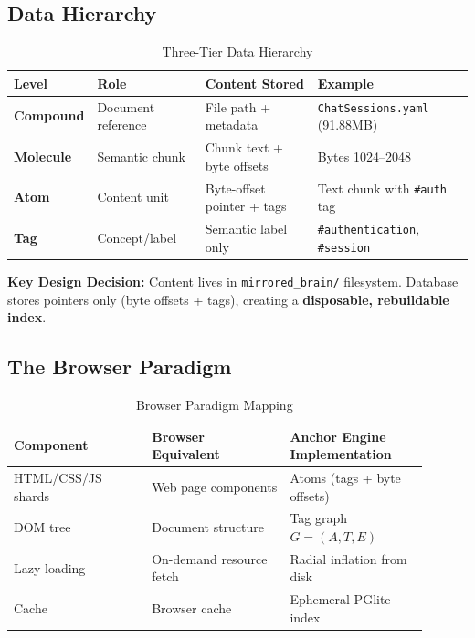 \documentclass[11pt]{article}
\begin{document}
\subsection{Data Hierarchy}

\begin{table}[h]
\centering
\caption{Three-Tier Data Hierarchy}
\label{tab:hierarchy}
\begin{tabular}{@{}llll@{}}
\toprule
\textbf{Level} & \textbf{Role} & \textbf{Content Stored} & \textbf{Example} \\ \midrule
\textbf{Compound} & Document reference & File path + metadata & \texttt{ChatSessions.yaml} (91.88MB) \\
\textbf{Molecule} & Semantic chunk & Chunk text + byte offsets & Bytes 1024--2048 \\
\textbf{Atom} & Content unit & Byte-offset pointer + tags & Text chunk with \texttt{\#auth} tag \\
\textbf{Tag} & Concept/label & Semantic label only & \texttt{\#authentication}, \texttt{\#session} \\ \bottomrule
\end{tabular}
\end{table}

\textbf{Key Design Decision:} Content lives in \texttt{mirrored\_brain/} filesystem. Database stores pointers only (byte offsets + tags), creating a \textbf{disposable, rebuildable index}.

\subsection{The Browser Paradigm}

\begin{table}[h]
\centering
\caption{Browser Paradigm Mapping}
\label{tab:browser_paradigm}
\begin{tabular}{@{}p{0.3\linewidth}p{0.3\linewidth}p{0.3\linewidth}@{}}
\toprule
\textbf{Component} & \textbf{Browser Equivalent} & \textbf{Anchor Engine Implementation} \\ \midrule
HTML/CSS/JS shards & Web page components & Atoms (tags + byte offsets) \\
DOM tree & Document structure & Tag graph $G = (A, T, E)$ \\
Lazy loading & On-demand resource fetch & Radial inflation from disk \\
Cache & Browser cache & Ephemeral PGlite index \\ \bottomrule
\end{tabular}
\end{table}
\end{document}
